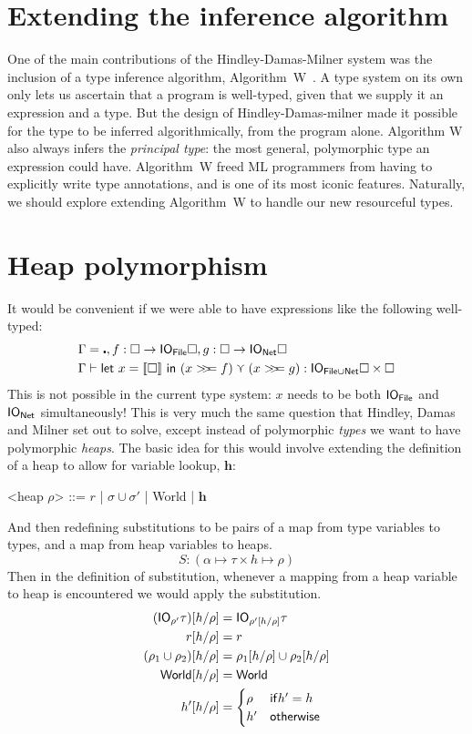 \section{Extending the inference algorithm}
One of the main contributions of the Hindley-Damas-Milner system was
the inclusion of a type inference algorithm,
Algorithm~W~\cite{milner1978}. A type system on its own only lets us
ascertain that a program is well-typed, given that we supply it an
expression and a type. But the design of Hindley-Damas-milner made it
possible for the type to be inferred algorithmically, from the program
alone. Algorithm W also always infers the \emph{principal type}: the
most general, polymorphic type an expression could have.  Algorithm~W
freed ML programmers from having to explicitly write type annotations,
and is one of its most iconic features. Naturally, we should explore
extending Algorithm~W to handle our new resourceful types.

\section{Heap polymorphism}
It would be convenient if we were able to have expressions like the
following well-typed:
\begin{align*}
\Gamma &= \centerdot , f : \square \rightarrow \IO_{\textsf{File}} \square, g : \square \rightarrow \IO_{\textsf{Net}} \square \\
\Gamma &\vdash \letin{x = \llbracket \square \rrbracket}{(x \bind f) \curlyvee (x \bind g)} : \IO_{\textsf{File} \cup
  \textsf{Net}} \square \times \square
\end{align*}
This is not possible in the current type system: $x$ needs to be both
$\mathsf{IO}_{\textsf{File}}$ and $\mathsf{IO}_{\textsf{Net}}$ simultaneously! This is
very much the same question that Hindley, Damas and Milner set out to
solve, except instead of polymorphic \textit{types} we want to have
polymorphic \textit{heaps}.
The basic idea for this would involve extending the definition of a
heap to allow for variable lookup, $\textbf{h}$:
\begin{grammar}
  <heap $\rho$> ::= $r$ | $\sigma \cup \sigma'$ | \textsf{World} | $\mathbf{h}$
\end{grammar}
And then redefining substitutions to be pairs of a map from
type variables to types, and a map from heap variables to heaps.
\[ S : ( \alpha \mapsto \tau \times h \mapsto \rho ) \]
Then in the definition of substitution, whenever a mapping from a heap
variable to heap is encountered we would apply the substitution.
\begin{align*}
  (\mathsf{IO}_{\rho'} \tau)[h/\rho] &= \mathsf{IO}_{\rho'[h/\rho]} \tau \\
  r[h/\rho] &= r \\
  (\rho_1 \cup \rho_2)[h/\rho] &= \rho_1[h/\rho] \cup \rho_2[h/\rho] \\
  \textsf{World}[h/\rho] &= \textsf{World} \\
  h'[h/\rho] &=
            \begin{cases}
              \rho & \mathsf{if} h' = h \\
              h' & \mathsf{otherwise}
            \end{cases}
\end{align*}

